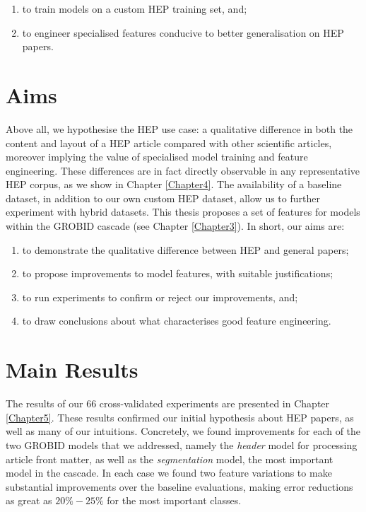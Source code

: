 \begin{enumerate}
\item to train models on a custom HEP training set, and;
\item to engineer specialised features conducive to better generalisation on HEP papers.
\end{enumerate}

\section{Aims}

Above all, we hypothesise the HEP use case: a qualitative difference in both the content and layout of a HEP article compared with other scientific articles, moreover implying the value of specialised model training and feature engineering. These differences are in fact directly observable in any representative HEP corpus, as we show in Chapter \ref{Chapter4}. The availability of a baseline dataset, in addition to our own custom HEP dataset, allow us to further experiment with hybrid datasets. This thesis proposes a set of features for models within the GROBID cascade (see Chapter \ref{Chapter3}). In short, our aims are:

\begin{enumerate}
\item to demonstrate the qualitative difference between HEP and general papers;
\item to propose improvements to model features, with suitable justifications;
\item to run experiments to confirm or reject our improvements, and;
\item to draw conclusions about what characterises good feature engineering.
\end{enumerate}

\section{Main Results}

The results of our 66 cross-validated experiments are presented in Chapter \ref{Chapter5}. These results confirmed our initial hypothesis about HEP papers, as well as many of our intuitions. Concretely, we found improvements for each of the two GROBID models that we addressed, namely the \emph{header} model for processing article front matter, as well as the \emph{segmentation} model, the most important model in the cascade. In each case we found two feature variations to make substantial improvements over the baseline evaluations, making error reductions as great as $20\%-25\%$ for the most important classes.

